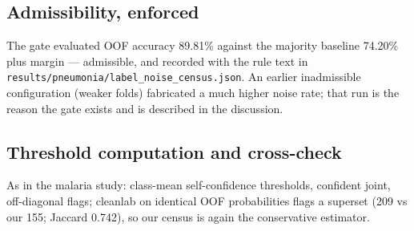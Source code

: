 \subsection{Admissibility, enforced}
The gate evaluated OOF accuracy 89.81\% against the majority baseline
74.20\% plus margin --- admissible, and recorded with the rule text in
\texttt{results/pneumonia/label\_noise\_census.json}. An earlier
inadmissible configuration (weaker folds) fabricated a much higher noise
rate; that run is the reason the gate exists and is described in the
discussion.
\subsection{Threshold computation and cross-check}
As in the malaria study: class-mean self-confidence thresholds, confident
joint, off-diagonal flags; cleanlab on identical OOF probabilities flags
a superset (209 vs our 155; Jaccard 0.742), so our census is again the
conservative estimator.

